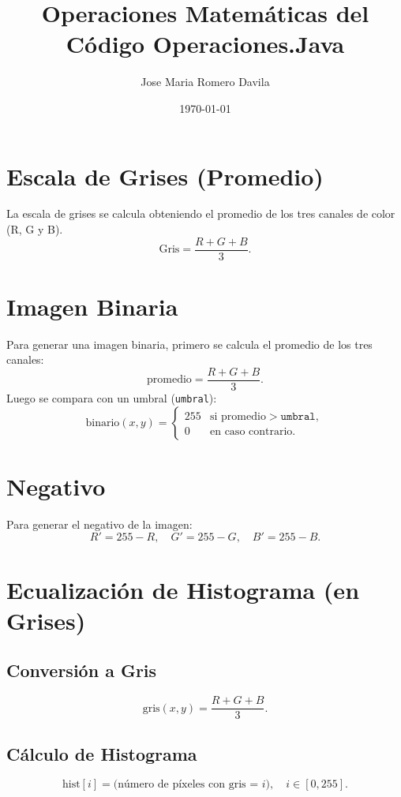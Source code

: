 \documentclass[11pt]{article}
\begin{document}
\title{Operaciones Matemáticas del Código Operaciones.Java}
\author{Jose Maria Romero Davila}
\date{\today}
\maketitle

\section{Escala de Grises (Promedio)}

La escala de grises se calcula obteniendo el promedio de los tres canales de color (R, G y B). 
\[
\text{Gris} = \frac{R + G + B}{3}.
\]

\section{Imagen Binaria}

Para generar una imagen binaria, primero se calcula el promedio de los tres canales:
\[
\text{promedio} = \frac{R + G + B}{3}.
\]
Luego se compara con un umbral (\texttt{umbral}):
\[
\text{binario}(x, y) = 
\begin{cases}
255 & \text{si } \text{promedio} > \texttt{umbral},\\
0   & \text{en caso contrario}.
\end{cases}
\]

\section{Negativo}
Para generar el negativo de la imagen:
\[
R' = 255 - R, 
\quad G' = 255 - G, 
\quad B' = 255 - B.
\]

\section{Ecualización de Histograma (en Grises)}

\subsection{Conversión a Gris}
\[
\text{gris}(x, y) = \frac{R + G + B}{3}.
\]

\subsection{Cálculo de Histograma}
\[
\text{hist}[i] = \text{(número de píxeles con gris = } i), \quad i \in [0, 255].
\]
\end{document}
